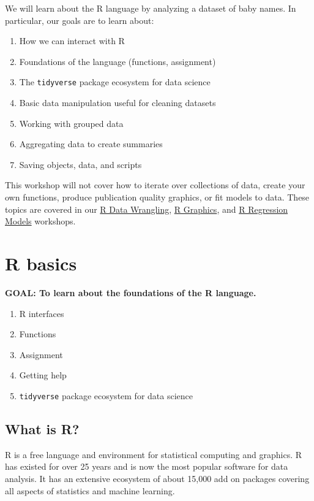 \documentclass[]{book}
\providecommand{\tightlist}{%
  \setlength{\itemsep}{0pt}\setlength{\parskip}{0pt}}
\begin{document}
We will learn about the R language by analyzing a dataset of baby names.
In particular, our goals are to learn about:

\begin{enumerate}
\def\labelenumi{\arabic{enumi}.}
\tightlist
\item
  How we can interact with R
\item
  Foundations of the language (functions, assignment)
\item
  The \texttt{tidyverse} package ecosystem for data science
\item
  Basic data manipulation useful for cleaning datasets
\item
  Working with grouped data
\item
  Aggregating data to create summaries
\item
  Saving objects, data, and scripts
\end{enumerate}

This workshop will not cover how to iterate over collections of data,
create your own functions, produce publication quality graphics, or fit
models to data. These topics are covered in our
\href{./RDataWrangling.html}{R Data Wrangling},
\href{./Rgraphics.html}{R Graphics}, and \href{./Rmodels.html}{R
Regression Models} workshops.

\section{R basics}\label{r-basics}

\textbf{GOAL: To learn about the foundations of the R language.}

\begin{enumerate}
\def\labelenumi{\arabic{enumi}.}
\tightlist
\item
  R interfaces
\item
  Functions
\item
  Assignment
\item
  Getting help
\item
  \texttt{tidyverse} package ecosystem for data science
\end{enumerate}

\subsection{What is R?}\label{what-is-r}

R is a free language and environment for statistical computing and
graphics. R has existed for over 25 years and is now the most popular
software for data analysis. It has an extensive ecosystem of about
15,000 add on packages covering all aspects of statistics and machine
learning.
\end{document}
